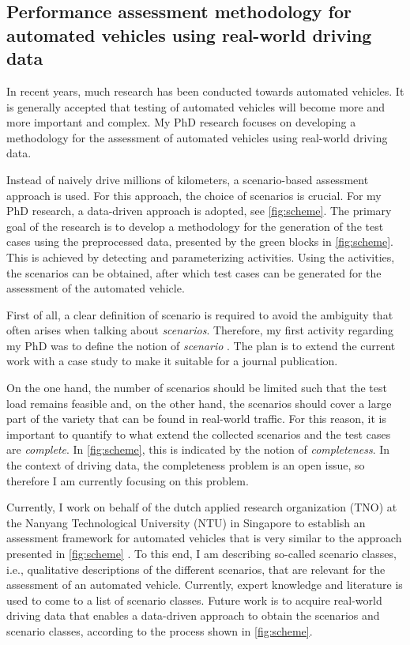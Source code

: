 \documentclass[10pt,final,a4paper,oneside,onecolumn]{article}
\begin{document}
\subsection*{Performance assessment methodology for automated vehicles using real-world driving data}

In recent years, much research has been conducted towards automated vehicles. It is generally accepted that testing of automated vehicles will become more and more important and complex. My PhD research focuses on developing a methodology for the assessment of automated vehicles using real-world driving data.

Instead of naively drive millions of kilometers, a scenario-based assessment approach is used. For this approach, the choice of scenarios is crucial. For my PhD research, a data-driven approach is adopted, see \cref{fig:scheme}. The primary goal of the research is to develop a methodology for the generation of the test cases using the preprocessed data, presented by the green blocks in \cref{fig:scheme}. This is achieved by detecting and parameterizing activities. Using the activities, the scenarios can be obtained, after which test cases can be generated for the assessment of the automated vehicle.

First of all, a clear definition of scenario is required to avoid the ambiguity that often arises when talking about \emph{scenarios}. Therefore, my first activity regarding my PhD was to define the notion of \emph{scenario} \cite{degelder2018ontology}. The plan is to extend the current work \cite{degelder2018ontology} with a case study to make it suitable for a journal publication.

On the one hand, the number of scenarios should be limited such that the test load remains feasible and, on the other hand, the scenarios should cover a large part of the variety that can be found in real-world traffic. For this reason, it is important to quantify to what extend the collected scenarios and the test cases are \emph{complete}. In \cref{fig:scheme}, this is indicated by the notion of \emph{completeness}. In the context of driving data, the completeness problem is an open issue, so therefore I am currently focusing on this problem. 

Currently, I work on behalf of the dutch applied research organization (TNO) at the Nanyang Technological University (NTU) in Singapore to establish an assessment framework for automated vehicles that is very similar to the approach presented in \cref{fig:scheme} \cite{ploeg2018cetran}. To this end, I am describing so-called scenario classes, i.e., qualitative descriptions of the different scenarios, that are relevant for the assessment of an automated vehicle. Currently, expert knowledge and literature is used to come to a list of scenario classes. Future work is to acquire real-world driving data that enables a data-driven approach to obtain the scenarios and scenario classes, according to the process shown in \cref{fig:scheme}.
\end{document}

